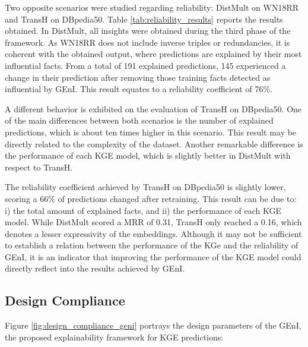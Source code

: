 Two opposite scenarios were studied regarding reliability: DistMult on WN18RR and TransH on DBpedia50. Table \ref{tab:reliability_results} reports the results obtained. In DistMult, all insights were obtained during the third phase of the framework. As WN18RR does not include inverse triples or redundancies, it is coherent with the obtained output, where predictions are explained by their most influential facts. From a total of 191 explained predictions, 145 experienced a change in their prediction after removing those training facts detected as influential by GEnI. This result equates to a reliability coefficient of 76\%.

A different behavior is exhibited on the evaluation of TransH on DBpedia50. One of the main differences between both scenarios is the number of explained predictions, which is about ten times higher in this scenario. This result may be directly related to the complexity of the dataset. Another remarkable difference is the performance of each KGE model, which is slightly better in DistMult with respect to TransH.

The reliability coefficient achieved by TransH on DBpedia50 is slightly lower, scoring a 66\% of predictions changed after retraining. This result can be due to: i) the total amount of explained facts, and ii) the performance of each KGE model. While DistMult scored a MRR of 0.31, TransH only reached a 0.16, which denotes a lesser expressivity of the embeddings. Although it may not be sufficient to establish a relation between the performance of the KGe and the reliability of GEnI, it is an indicator that improving the performance of the KGE model could directly reflect into the results achieved by GEnI.

\subsection{Design Compliance}\label{6_sec:subsec:geni_design_compliance}
Figure \ref{fig:design_compliance_geni} portrays the design parameters of the GEnI, the proposed explainability framework for KGE predictions: 

